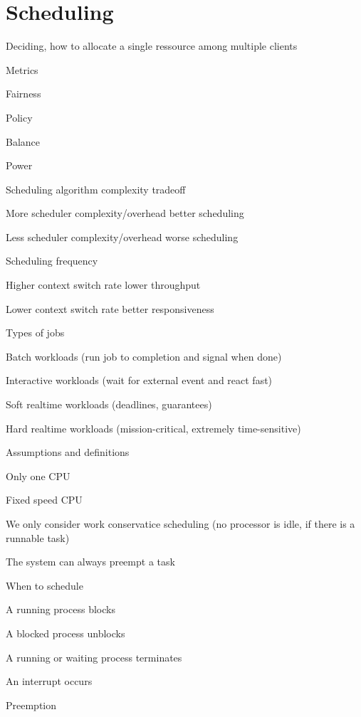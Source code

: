\section{Scheduling}
\enumstart
	\item Deciding, how to allocate a single ressource among multiple clients
	\item Metrics
	\enumstart
		\item Fairness
		\item Policy
		\item Balance
		\item Power
	\enumend
	\item Scheduling algorithm complexity tradeoff
	\enumstart
		\item More scheduler complexity/overhead \arrow better scheduling
		\item Less scheduler complexity/overhead \arrow worse scheduling
	\enumend
	\item Scheduling frequency
	\enumstart
		\item Higher context switch rate \arrow lower throughput
		\item Lower context switch rate \arrow better responsiveness
	\enumend
	\item Types of jobs
	\enumstart
		\item Batch workloads (run job to completion and signal when done)
		\item Interactive workloads (wait for external event and react fast)
		\item Soft realtime workloads (deadlines, guarantees)
		\item Hard realtime workloads (mission-critical, extremely time-sensitive)
	\enumend
	\item Assumptions and definitions
	\enumstart
		\item Only one CPU
		\item Fixed speed CPU
		\item We only consider work conservatice scheduling (no processor is idle, if there is a runnable task)
		\item The system can always preempt a task
	\enumend
	\item When to schedule
	\enumstart
		\item A running process blocks
		\item A blocked process unblocks
		\item A running or waiting process terminates
		\item An interrupt occurs
	\enumend
	\item Preemption
